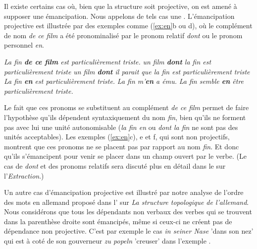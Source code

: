 {Il existe certains cas où, bien que la structure soit projective, on est amené à supposer une émancipation. Nous appelons de tels cas une . L'émancipation projective est illustrée par des exemples comme (\ref{ex:en}b ou d), où le complément de nom \textit{de ce film} a été pronominalisé par le pronom relatif \textit{dont} ou le pronom personnel \textit{en}.

\ea\label{ex:en}
\ea \textit{La fin \textbf{de ce film} est particulièrement triste.}
\ex \textit{un film \textbf{dont} la fin est particulièrement triste}
\ex \textit{un film \textbf{dont} il parait que la fin est particulièrement triste}
\ex \textit{La fin \textbf{en} est particulièrement triste.}
\ex \textit{La fin m'\textbf{en} a ému.}
\ex \textit{La fin semble \textbf{en} être particulièrement triste.}
\z\z

Le fait que ces pronoms se substituent au complément \textit{de ce film} permet de faire l'hypothèse qu'ils dépendent syntaxiquement du nom \textit{fin}, bien qu'ils ne forment pas avec lui une unité autonomisable (\textit{la fin en} ou \textit{dont la fin} ne sont pas des unités acceptables). Les exemples (\ref{ex:en}c), e et f, qui sont non projectifs, montrent que ces pronoms ne se placent pas par rapport au nom \textit{fin}. Et donc qu'ils s'émancipent pour venir se placer dans un champ ouvert par le verbe. (Le cas de \textit{dont} et des pronoms relatifs sera discuté plus en détail dans le  sur l'\textit{Extraction}.)

Un autre cas d'émancipation projective est illustré par notre analyse de l'ordre des mots en allemand proposé dans l' sur \textit{La structure topologique de l’allemand}. Nous considérons que tous les dépendants non verbaux des verbes qui se trouvent dans la parenthèse droite sont émancipés, même si ceux-ci ne créent pas de dépendance non projective. C'est par exemple le cas \textit{in seiner Nase} 'dans son nez' qui est à coté de son gouverneur \textit{zu popeln} 'creuser' dans l'exemple .
}

